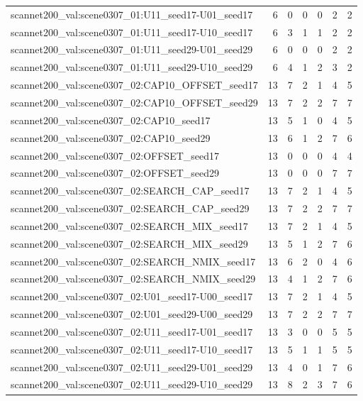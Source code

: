 \begin{table}[t]
\begin{tabular}{lrrrrrr}
scannet200\_val:scene0307\_01:U11\_seed17-U01\_seed17 & 6 & 0 & 0 & 0 & 2 & 2 \\
scannet200\_val:scene0307\_01:U11\_seed17-U10\_seed17 & 6 & 3 & 1 & 1 & 2 & 2 \\
scannet200\_val:scene0307\_01:U11\_seed29-U01\_seed29 & 6 & 0 & 0 & 0 & 2 & 2 \\
scannet200\_val:scene0307\_01:U11\_seed29-U10\_seed29 & 6 & 4 & 1 & 2 & 3 & 2 \\
scannet200\_val:scene0307\_02:CAP10\_OFFSET\_seed17 & 13 & 7 & 2 & 1 & 4 & 5 \\
scannet200\_val:scene0307\_02:CAP10\_OFFSET\_seed29 & 13 & 7 & 2 & 2 & 7 & 7 \\
scannet200\_val:scene0307\_02:CAP10\_seed17 & 13 & 5 & 1 & 0 & 4 & 5 \\
scannet200\_val:scene0307\_02:CAP10\_seed29 & 13 & 6 & 1 & 2 & 7 & 6 \\
scannet200\_val:scene0307\_02:OFFSET\_seed17 & 13 & 0 & 0 & 0 & 4 & 4 \\
scannet200\_val:scene0307\_02:OFFSET\_seed29 & 13 & 0 & 0 & 0 & 7 & 7 \\
scannet200\_val:scene0307\_02:SEARCH\_CAP\_seed17 & 13 & 7 & 2 & 1 & 4 & 5 \\
scannet200\_val:scene0307\_02:SEARCH\_CAP\_seed29 & 13 & 7 & 2 & 2 & 7 & 7 \\
scannet200\_val:scene0307\_02:SEARCH\_MIX\_seed17 & 13 & 7 & 2 & 1 & 4 & 5 \\
scannet200\_val:scene0307\_02:SEARCH\_MIX\_seed29 & 13 & 5 & 1 & 2 & 7 & 6 \\
scannet200\_val:scene0307\_02:SEARCH\_NMIX\_seed17 & 13 & 6 & 2 & 0 & 4 & 6 \\
scannet200\_val:scene0307\_02:SEARCH\_NMIX\_seed29 & 13 & 4 & 1 & 2 & 7 & 6 \\
scannet200\_val:scene0307\_02:U01\_seed17-U00\_seed17 & 13 & 7 & 2 & 1 & 4 & 5 \\
scannet200\_val:scene0307\_02:U01\_seed29-U00\_seed29 & 13 & 7 & 2 & 2 & 7 & 7 \\
scannet200\_val:scene0307\_02:U11\_seed17-U01\_seed17 & 13 & 3 & 0 & 0 & 5 & 5 \\
scannet200\_val:scene0307\_02:U11\_seed17-U10\_seed17 & 13 & 5 & 1 & 1 & 5 & 5 \\
scannet200\_val:scene0307\_02:U11\_seed29-U01\_seed29 & 13 & 4 & 0 & 1 & 7 & 6 \\
scannet200\_val:scene0307\_02:U11\_seed29-U10\_seed29 & 13 & 8 & 2 & 3 & 7 & 6 \\

\end{tabular}
\end{table}

